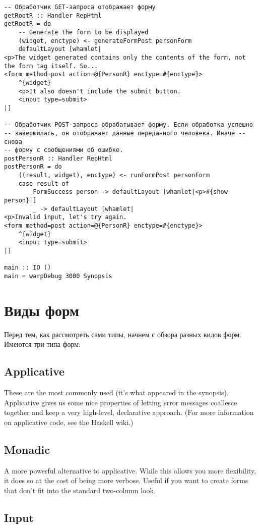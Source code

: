 \begin{lstlisting}
-- Обработчик GET-запроса отображает форму
getRootR :: Handler RepHtml
getRootR = do
    -- Generate the form to be displayed
    (widget, enctype) <- generateFormPost personForm
    defaultLayout [whamlet|
<p>The widget generated contains only the contents of the form, not the form tag itself. So...
<form method=post action=@{PersonR} enctype=#{enctype}>
    ^{widget}
    <p>It also doesn't include the submit button.
    <input type=submit>
|]

-- Обработчик POST-запроса обрабатывает форму. Если обработка успешно 
-- завершилась, он отображает данные переданного человека. Иначе -- снова
-- форму с сообщениями об ошибке.
postPersonR :: Handler RepHtml
postPersonR = do
    ((result, widget), enctype) <- runFormPost personForm
    case result of
        FormSuccess person -> defaultLayout [whamlet|<p>#{show person}|]
        _ -> defaultLayout [whamlet|
<p>Invalid input, let's try again.
<form method=post action=@{PersonR} enctype=#{enctype}>
    ^{widget}
    <input type=submit>
|]

main :: IO ()
main = warpDebug 3000 Synopsis
\end{lstlisting}

\section{Виды форм}

Перед тем, как рассмотреть сами типы, начнем с обзора разных видов форм. Имеются три типа форм:

\subsection{Applicative}

These are the most commonly used (it's what appeared in the synopsis). Applicative gives us some nice properties of letting error messages coallesce together and keep a very high-level, declarative approach. (For more information on applicative code, see the Haskell wiki.)

\subsection{Monadic}

A more powerful alternative to applicative. While this allows you more flexibility, it does so at the cost of being more verbose. Useful if you want to create forms that don't fit into the standard two-column look.

\subsection{Input}

